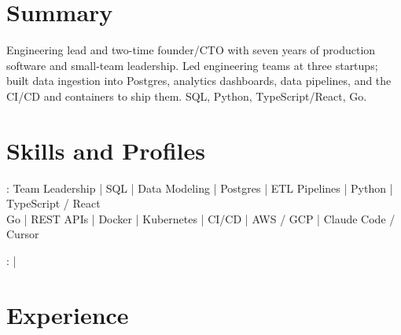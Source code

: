 \documentclass[print]{jack-resume}
\begin{document}
\pagecolor{darkmodeBackground}


\begin{minipage}[t][1cm][t]{.03\textwidth}
    \hfill
\end{minipage}

\section{Summary}
Engineering lead and two-time founder/CTO with seven years of production software and small-team leadership. Led engineering teams at three startups; built data ingestion into Postgres, analytics dashboards, data pipelines, and the CI/CD and containers to ship them. SQL, Python, TypeScript/React, Go.
\sectionsep

\section{Skills and Profiles}
:
Team Leadership \hfill | \hfill
SQL \hfill | \hfill
Data Modeling \hfill | \hfill
Postgres \hfill | \hfill
ETL Pipelines \hfill | \hfill
Python \hfill | \hfill
TypeScript / React \\
\hspace{1.0cm} Go \hfill | \hfill
REST APIs \hfill | \hfill
Docker \hfill | \hfill
Kubernetes \hfill | \hfill
CI/CD \hfill | \hfill
AWS / GCP \hfill | \hfill
Claude Code / Cursor \\

\raggedright{
    :
      \href{https://www.linkedin.com/in/jack-sturtevant/}{ \ExternalLink} |
     \href{https://github.com/jacksturt}{ \ExternalLink}}

\section{Experience}
\end{document}
